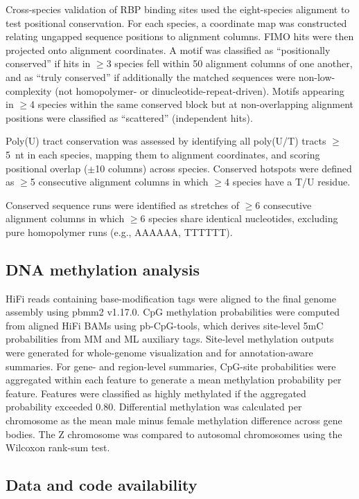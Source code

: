 \documentclass[12pt]{article}
\begin{document}
Cross-species validation of RBP binding sites
used the eight-species alignment to test positional conservation.
For each species, a coordinate map was constructed
relating ungapped sequence positions to alignment columns.
FIMO hits were then projected onto alignment coordinates.
A motif was classified as ``positionally conserved''
if hits in $\geq$3 species fell within 50 alignment columns
of one another,
and as ``truly conserved'' if additionally
the matched sequences were non-low-complexity
(not homopolymer- or dinucleotide-repeat-driven).
Motifs appearing in $\geq$4 species within the same conserved block
but at non-overlapping alignment positions
were classified as ``scattered'' (independent hits).

Poly(U) tract conservation was assessed
by identifying all poly(U/T) tracts $\geq$5~nt in each species,
mapping them to alignment coordinates,
and scoring positional overlap ($\pm$10 columns) across species.
Conserved hotspots were defined as $\geq$5 consecutive alignment columns
in which $\geq$4 species have a T/U residue.

Conserved sequence runs were identified as stretches of $\geq$6
consecutive alignment columns in which $\geq$6 species
share identical nucleotides,
excluding pure homopolymer runs (e.g., AAAAAA, TTTTTT).

\subsection*{DNA methylation analysis}

HiFi reads containing base-modification tags were aligned to the final genome assembly
using pbmm2 v1.17.0.
CpG methylation probabilities were computed from aligned HiFi BAMs
using pb-CpG-tools,
which derives site-level 5mC probabilities from MM and ML auxiliary tags.
Site-level methylation outputs were generated for whole-genome visualization
and for annotation-aware summaries.
For gene- and region-level summaries,
CpG-site probabilities were aggregated within each feature
to generate a mean methylation probability per feature.
Features were classified as highly methylated
if the aggregated probability exceeded 0.80.
Differential methylation was calculated per chromosome as the mean
male minus female methylation difference across gene bodies.
The Z chromosome was compared to autosomal chromosomes
using the Wilcoxon rank-sum test.

\subsection*{Data and code availability}
\end{document}

